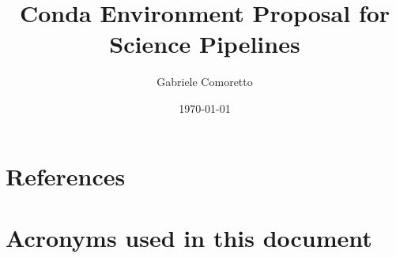 \documentclass[DM,authoryear,toc,lsstdraft]{lsstdoc}
\title{Conda Environment Proposal for Science Pipelines}
\author{%
Gabriele Comoretto
}
\date{\today}
\begin{document}
\maketitle




\newpage
\appendix

\section{References} \label{sec:bib}



\section{Acronyms used in this document}\label{sec:acronyms}

\end{document}
